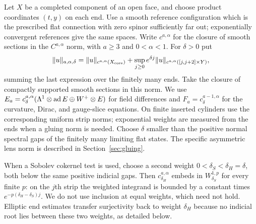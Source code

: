 Let $X$ be a completed component of an open face, and choose product
coordinates $(t,y)$ on each end.  Use a smooth reference configuration
which is the prescribed flat connection with zero spinor sufficiently
far out; exponentially convergent references give the same spaces.  Write
$c^{a,\alpha}$ for the closure of smooth sections in the $C^{a,\alpha}$
norm, with $a\geq3$ and $0<\alpha<1$.  For $\delta>0$ put
\begin{equation}\label{eq:analysis:weighted-norm}
 \|u\|_{a,\alpha,\delta}
 =\|u\|_{c^{a,\alpha}(X_{\rm core})}
  +\sup_{j\geq0}e^{\delta j}
      \|u\|_{c^{a,\alpha}([j,j+2]\times Y)},
\end{equation}
summing the last expression over the finitely many ends.  Take the
closure of compactly supported smooth sections in this norm.  We use
$E_a=c^{a,\alpha}_\delta(\Lambda^1\otimes\operatorname{ad} E\oplus W^+\otimes E)$
for field differences and $F_a=c^{a-1,\alpha}_\delta$ for the curvature,
Dirac, and gauge-slice equations.  On finite inserted cylinders use the
corresponding uniform strip norms; exponential weights are measured from
the ends when a gluing norm is needed.  Choose $\delta$ smaller than the
positive normal spectral gaps of the finitely many limiting flat states.
The specific asymmetric lens norm is described in
Section~\ref{sec:gluing}.

When a Sobolev cokernel test is used, choose a second weight
$0<\delta_S<\delta_H=\delta$, both below the same positive indicial
gaps.  Then $c^{a,\alpha}_{\delta_H}$ embeds in
$W^{1,p}_{\delta_S}$ for every finite $p$: on the $j$th strip the
weighted integrand is bounded by a constant times
$e^{-p(\delta_H-\delta_S)j}$.  We do not use inclusion at equal
weights, which need not hold.  Elliptic end estimates transfer
surjectivity back to weight $\delta_H$ because no indicial root lies
between these two weights, as detailed below.

